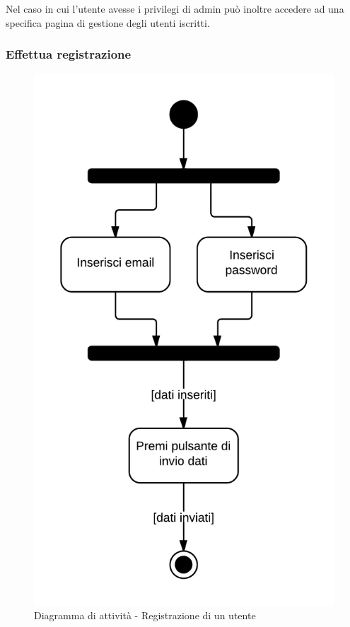 Nel caso in cui l'utente avesse i privilegi di admin può inoltre accedere ad una specifica pagina di gestione degli utenti iscritti.

\subsubsection{Effettua registrazione}

\begin{figure}[H]
\centering
\includegraphics[scale=0.2]{uml/MaaP - Effettua registrazione.png}
\caption{Diagramma di attività - Registrazione di un utente}
\end{figure}

